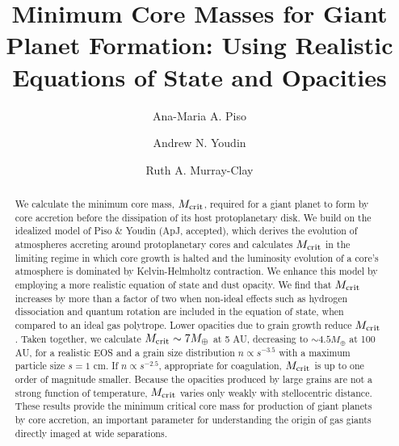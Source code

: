 \documentclass[apj]{emulateapj}
\begin{document}



\title{Minimum Core Masses for Giant Planet Formation: Using Realistic Equations of State and Opacities}
\author{Ana-Maria A. Piso}
\author{Andrew N. Youdin}
\author{Ruth A. Murray-Clay}

\begin{abstract}

We calculate the minimum core mass, $M_{\rm crit}$, required for a giant planet to form by core accretion before the dissipation of its host protoplanetary disk. We build on the idealized model of Piso \& Youdin (ApJ, accepted), which derives the evolution of atmospheres accreting around protoplanetary cores and calculates $M_{\rm crit}$ in the limiting regime in which core growth is halted and the luminosity evolution of a core's atmosphere is dominated by Kelvin-Helmholtz contraction. We enhance this model by employing a more realistic equation of state and dust opacity. We find that $M_{\rm crit}$ increases by more than a factor of two when non-ideal effects such as hydrogen dissociation and quantum rotation are included in the equation of state, when compared to an ideal gas polytrope. Lower opacities due to grain growth reduce $M_{\rm crit}$. Taken together, we calculate $M_{\rm crit} \sim 7 M_{\oplus}$ at 5 AU, decreasing to $\sim$$4.5 M_{\oplus}$ at 100 AU, for a realistic EOS and a grain size distribution $n \propto s^{-3.5}$ with a maximum particle size $s=1$ cm. 
If $n \propto s^{-2.5}$, appropriate for coagulation, $M_{\rm crit}$ is up to one order of magnitude smaller. Because the opacities produced by large grains are not a strong function of temperature, $M_{\rm crit}$ varies only weakly with stellocentric distance. These results provide the minimum critical core mass for production of giant planets by core accretion, an important parameter for understanding the origin of gas giants directly imaged at wide separations. 



\end{abstract}
\end{document}
